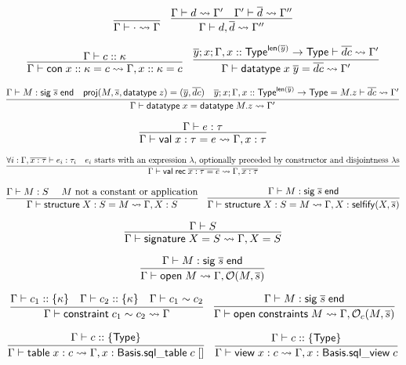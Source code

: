 \documentclass{article}
\newcommand{\mt}[1]{\mathsf{#1}}
\begin{document}
$$\infer{\Gamma \vdash \cdot \leadsto \Gamma}{}
\quad \infer{\Gamma \vdash d, \overline{d} \leadsto \Gamma''}{
  \Gamma \vdash d \leadsto \Gamma'
  & \Gamma' \vdash \overline{d} \leadsto \Gamma''
}$$

$$\infer{\Gamma \vdash \mt{con} \; x :: \kappa = c \leadsto \Gamma, x :: \kappa = c}{
  \Gamma \vdash c :: \kappa
}
\quad \infer{\Gamma \vdash \mt{datatype} \; x \; \overline{y} = \overline{dc} \leadsto \Gamma'}{
  \overline{y}; x; \Gamma, x :: \mt{Type}^{\mt{len}(\overline y)} \to \mt{Type} \vdash \overline{dc} \leadsto \Gamma'
}$$

$$\infer{\Gamma \vdash \mt{datatype} \; x = \mt{datatype} \; M.z \leadsto \Gamma'}{
  \Gamma \vdash M : \mt{sig} \; \overline{s} \; \mt{end}
  & \mt{proj}(M, \overline{s}, \mt{datatype} \; z) = (\overline{y}, \overline{dc})
  & \overline{y}; x; \Gamma, x :: \mt{Type}^{\mt{len}(\overline y)} \to \mt{Type} = M.z \vdash \overline{dc} \leadsto \Gamma'
}$$

$$\infer{\Gamma \vdash \mt{val} \; x : \tau = e \leadsto \Gamma, x : \tau}{
  \Gamma \vdash e : \tau
}$$

$$\infer{\Gamma \vdash \mt{val} \; \mt{rec} \; \overline{x : \tau = e} \leadsto \Gamma, \overline{x : \tau}}{
  \forall i: \Gamma, \overline{x : \tau} \vdash e_i : \tau_i
  & \textrm{$e_i$ starts with an expression $\lambda$, optionally preceded by constructor and disjointness $\lambda$s}
}$$

$$\infer{\Gamma \vdash \mt{structure} \; X : S = M \leadsto \Gamma, X : S}{
  \Gamma \vdash M : S
  & \textrm{ $M$ not a constant or application}
}
\quad \infer{\Gamma \vdash \mt{structure} \; X : S = M \leadsto \Gamma, X : \mt{selfify}(X, \overline{s})}{
  \Gamma \vdash M : \mt{sig} \; \overline{s} \; \mt{end}
}$$

$$\infer{\Gamma \vdash \mt{signature} \; X = S \leadsto \Gamma, X = S}{
  \Gamma \vdash S
}$$

$$\infer{\Gamma \vdash \mt{open} \; M \leadsto \Gamma, \mathcal O(M, \overline{s})}{
  \Gamma \vdash M : \mt{sig} \; \overline{s} \; \mt{end}
}$$

$$\infer{\Gamma \vdash \mt{constraint} \; c_1 \sim c_2 \leadsto \Gamma}{
  \Gamma \vdash c_1 :: \{\kappa\}
  & \Gamma \vdash c_2 :: \{\kappa\}
  & \Gamma \vdash c_1 \sim c_2
}
\quad \infer{\Gamma \vdash \mt{open} \; \mt{constraints} \; M \leadsto \Gamma, \mathcal O_c(M, \overline{s})}{
  \Gamma \vdash M : \mt{sig} \; \overline{s} \; \mt{end}
}$$

$$\infer{\Gamma \vdash \mt{table} \; x : c \leadsto \Gamma, x : \mt{Basis}.\mt{sql\_table} \; c \; []}{
  \Gamma \vdash c :: \{\mt{Type}\}
}
\quad \infer{\Gamma \vdash \mt{view} \; x : c \leadsto \Gamma, x : \mt{Basis}.\mt{sql\_view} \; c}{
  \Gamma \vdash c :: \{\mt{Type}\}
}$$
\end{document}
